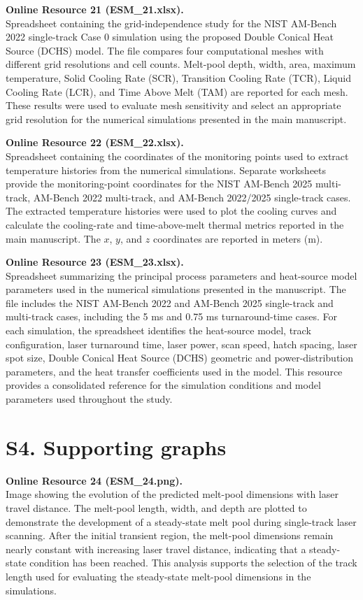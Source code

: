 \documentclass[11pt]{article}
\begin{document}
\medskip

\textbf{Online Resource 21 (ESM\_21.xlsx).}\\
Spreadsheet containing the grid-independence study for the NIST AM-Bench
2022 single-track Case 0 simulation using the proposed Double Conical Heat
Source (DCHS) model. The file compares four computational meshes with
different grid resolutions and cell counts. Melt-pool depth, width, area,
maximum temperature, Solid Cooling Rate (SCR), Transition Cooling Rate
(TCR), Liquid Cooling Rate (LCR), and Time Above Melt (TAM) are reported
for each mesh. These results were used to evaluate mesh sensitivity and
select an appropriate grid resolution for the numerical simulations
presented in the main manuscript.

\medskip

\textbf{Online Resource 22 (ESM\_22.xlsx).}\\
Spreadsheet containing the coordinates of the monitoring points used to
extract temperature histories from the numerical simulations. Separate
worksheets provide the monitoring-point coordinates for the NIST AM-Bench
2025 multi-track, AM-Bench 2022 multi-track, and AM-Bench 2022/2025
single-track cases. The extracted temperature histories were used to plot
the cooling curves and calculate the cooling-rate and time-above-melt
thermal metrics reported in the main manuscript. The $x$, $y$, and $z$
coordinates are reported in meters (m).

\textbf{Online Resource 23 (ESM\_23.xlsx).}\\
Spreadsheet summarizing the principal process parameters and heat-source
model parameters used in the numerical simulations presented in the
manuscript. The file includes the NIST AM-Bench 2022 and AM-Bench 2025
single-track and multi-track cases, including the 5 ms and 0.75 ms
turnaround-time cases. For each simulation, the spreadsheet identifies
the heat-source model, track configuration, laser turnaround time, laser
power, scan speed, hatch spacing, laser spot size, Double Conical Heat
Source (DCHS) geometric and power-distribution parameters, and the heat
transfer coefficients used in the model. This resource provides a
consolidated reference for the simulation conditions and model parameters
used throughout the study.

\section*{S4. Supporting graphs}

\textbf{Online Resource 24 (ESM\_24.png).}\\
Image showing the evolution of the predicted melt-pool dimensions with
laser travel distance. The melt-pool length, width, and depth are plotted
to demonstrate the development of a steady-state melt pool during
single-track laser scanning. After the initial transient region, the
melt-pool dimensions remain nearly constant with increasing laser travel
distance, indicating that a steady-state condition has been reached. This
analysis supports the selection of the track length used for evaluating
the steady-state melt-pool dimensions in the simulations.
\end{document}
